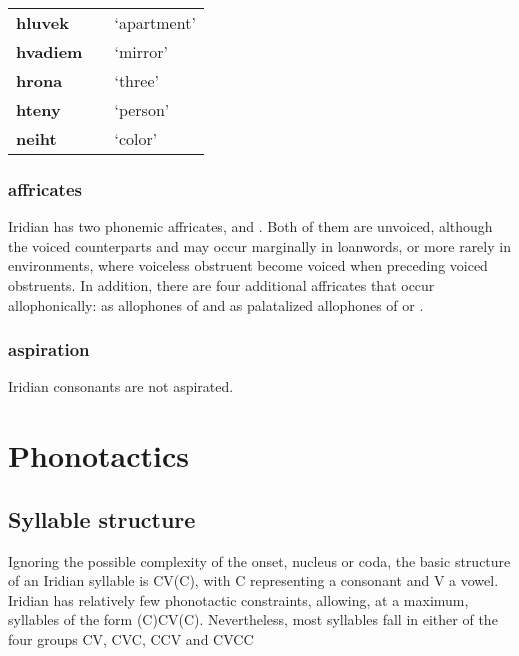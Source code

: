 \begin{center} \small
	\begin{tabularx}{0.8\textwidth}{>{\bfseries}YYY}
		hluvek		& 		& `apartment'\\
		hvadiem		& 				&`mirror'\\
		hrona		& 	& `three'\\
		hteny		& 	&`person'\\
		neiht		&  & `color'\\
	\end{tabularx}
\end{center}
\subsubsection{affricates}
\par Iridian has two phonemic affricates,  and . Both of them are unvoiced, although the voiced counterparts  and  may occur marginally in loanwords, or more rarely in  environments, where voiceless obstruent become voiced when preceding voiced obstruents. In addition, there are four additional affricates that occur allophonically:  as allophones of  and  as palatalized allophones of  or .
\par 
\subsubsection{aspiration}
\par Iridian consonants are not aspirated.

\section{Phonotactics}

\subsection{Syllable structure}

Ignoring the possible complexity of the onset, nucleus or coda, the basic structure of an Iridian syllable is CV(C), with C representing a consonant and V a vowel. Iridian has relatively few phonotactic constraints, allowing, at a maximum, syllables of the form (C)CV(C). Nevertheless, most syllables fall in either of the four groups CV, CVC, CCV and CVCC

